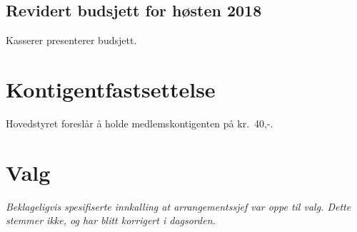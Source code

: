 \documentclass[10pt,norsk,a4paper]{article}
\begin{document}
\subsection{Revidert budsjett for høsten 2018}
Kasserer presenterer budsjett.


\section{Kontigentfastsettelse}
Hovedstyret foreslår å holde medlemskontigenten på kr.~40,-.

\newpage
\section{Valg}

\textit{Beklageligvis spesifiserte innkalling at arrangementssjef var oppe til valg. Dette stemmer ikke, og har blitt korrigert i dagsorden.}
\end{document}
